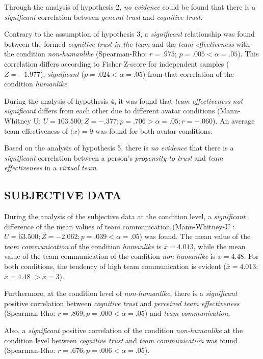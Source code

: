 \documentclass[sigchi]{acmart}
\begin{document}
Through the analysis of hypothesis 2, \textit{no evidence} could be found that there is a \textit{significant} correlation between \textit{general trust} and \textit{cognitive trust}. 

Contrary to the assumption of hypothesis 3, a \textit{significant} relationship was found between the formed \textit{cognitive trust in the team} and the \textit{team effectiveness} with the condition \textit{non-humanlike} (Spearman-Rho: $r =.975$; $p =.005 < \alpha = .05$). This correlation differs according to Fisher Z-score for independent samples ($Z=-1.977$), \textit{significant} ($p =.024 < \alpha = .05$) from that correlation of the condition \textit{humanlike}.
 
During the analysis of hypothesis 4, it was found that \textit{team effectiveness} \textit{not significant} differs from each other due to different avatar conditions (Mann-Whitney U: $U = 103.500; Z = -.377; p =.706 > \alpha = .05; r = -.060$). An average team effectiveness of $\bar(x) = 9$ was found for both avatar conditions.

Based on the analysis of hypothesis 5, there is \textit{no evidence} that there is a \textit{significant} correlation between a person's \textit{propensity to trust} and \textit{team effectiveness} in a \textit{virtual team}.

\subsection{SUBJECTIVE DATA}
During the analysis of the subjective data at the condition level, a \textit{significant} difference of the mean values of team communication (Mann-Whitney-U : $U = 63.500; Z = -2.062; p =.039 < \alpha = .05$) was found. The mean value of the \textit{team communication} of the condition \textit{humanlike} is $\bar{x} = 4.013$, while the mean value of the team communication of the condition \textit{non-humanlike} is $\bar{x} = 4.48$. For both conditions, the tendency of high team communication is evident ($\bar{x} = 4.013$; $\bar{x} = 4.48$ $ > \bar{x} = 3$).

Furthermore, at the condition level of \textit{non-humanlike}, there is a \textit{significant} positive correlation between \textit{cognitive trust} and \textit{perceived team effectiveness} (Spearman-Rho: $r =.869; p =.000 < \alpha = .05$) and \textit{team communication}.

Also, a \textit{significant} positive correlation of the condition \textit{non-humanlike} at the condition level between \textit{cognitive trust} and \textit{team communication} was found (Spearman-Rho: $r =.676; p =.006 < \alpha = .05$).
\end{document}
